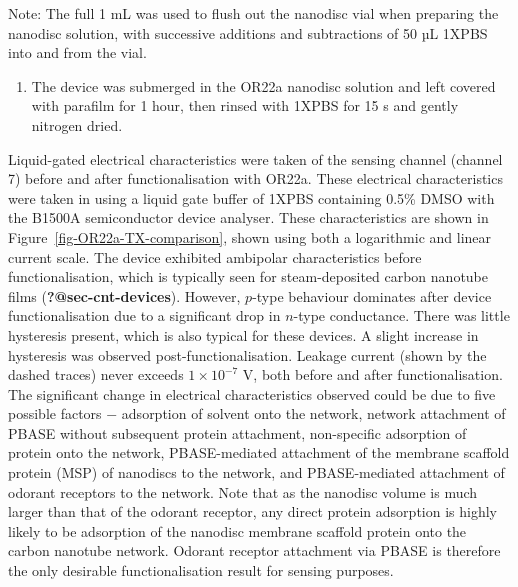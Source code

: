\documentclass[
  a4paper,
]{scrbook}
\providecommand{\tightlist}{%
  \setlength{\itemsep}{0pt}\setlength{\parskip}{0pt}}\usepackage{longtable,booktabs,array}
\begin{document}
Note: The full 1 mL was used to flush out the nanodisc vial when
preparing the nanodisc solution, with successive additions and
subtractions of 50 µL 1XPBS into and from the vial.

\begin{enumerate}
\def\labelenumi{\arabic{enumi}.}
\setcounter{enumi}{6}
\tightlist
\item
  The device was submerged in the OR22a nanodisc solution and left
  covered with parafilm for 1 hour, then rinsed with 1XPBS for 15 s and
  gently nitrogen dried.
\end{enumerate}

Liquid-gated electrical characteristics were taken of the sensing
channel (channel 7) before and after functionalisation with OR22a. These
electrical characteristics were taken in using a liquid gate buffer of
1XPBS containing 0.5\% DMSO with the B1500A semiconductor device
analyser. These characteristics are shown in
Figure~\ref{fig-OR22a-TX-comparison}, shown using both a logarithmic and
linear current scale. The device exhibited ambipolar characteristics
before functionalisation, which is typically seen for steam-deposited
carbon nanotube films (\textbf{?@sec-cnt-devices}). However, \(p\)-type
behaviour dominates after device functionalisation due to a significant
drop in \(n\)-type conductance. There was little hysteresis present,
which is also typical for these devices. A slight increase in hysteresis
was observed post-functionalisation. Leakage current (shown by the
dashed traces) never exceeds \(1 \times 10^{-7}\) V, both before and
after functionalisation. The significant change in electrical
characteristics observed could be due to five possible factors \(-\)
adsorption of solvent onto the network, network attachment of PBASE
without subsequent protein attachment, non-specific adsorption of
protein onto the network, PBASE-mediated attachment of the membrane
scaffold protein (MSP) of nanodiscs to the network, and PBASE-mediated
attachment of odorant receptors to the network. Note that as the
nanodisc volume is much larger than that of the odorant receptor, any
direct protein adsorption is highly likely to be adsorption of the
nanodisc membrane scaffold protein onto the carbon nanotube network.
Odorant receptor attachment via PBASE is therefore the only desirable
functionalisation result for sensing purposes.
\end{document}

